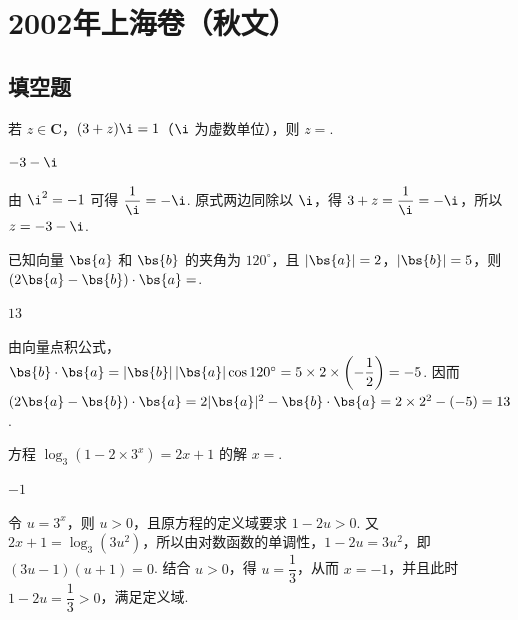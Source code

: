 \chapter{2002年上海卷（秋文）}
\section{填空题}
\begin{problem}
若 \(z \in \mathbf{C}\)，\((3 + z)\i = 1\)（\(\i\) 为虚数单位），则 \(z=\)\fillinblank{}.
\end{problem}

\begin{answer}
\(-3-\i\)
\end{answer}

\begin{solution}
由 \(\i^2=-1\) 可得 \(\dfrac{1}{\i}=-\i\). 原式两边同除以 \(\i\)，得 \(3+z=\dfrac{1}{\i}=-\i\)，所以 \(z=-3-\i\).
\end{solution}

\begin{problem}
已知向量 \(\bs{a}\) 和 \(\bs{b}\) 的夹角为 \(120^{\circ}\)，且 \(|\bs{a}| = 2\)，\(|\bs{b}| = 5\)，则 \((2\bs{a} - \bs{b}) \cdot \bs{a}=\)\fillinblank{}.
\end{problem}

\begin{answer}
\(13\)
\end{answer}

\begin{solution}
由向量点积公式，\(\bs{b}\cdot\bs{a}=|\bs{b}|\,|\bs{a}|\cos120^{\circ}=5\times2\times\left(-\dfrac{1}{2}\right)=-5\). 因而 \((2\bs{a}-\bs{b})\cdot\bs{a}=2|\bs{a}|^2-\bs{b}\cdot\bs{a}=2\times2^2-(-5)=13\).
\end{solution}

\begin{problem}
方程 \(\log_{3}(1 - 2 \times 3^{x}) = 2x + 1\) 的解 \(x=\)\fillinblank{}.
\end{problem}

\begin{answer}
\(-1\)
\end{answer}

\begin{solution}
令 \(u=3^x\)，则 \(u>0\)，且原方程的定义域要求 \(1-2u>0\). 又 \(2x+1=\log_3(3u^2)\)，所以由对数函数的单调性，\(1-2u=3u^2\)，即 \((3u-1)(u+1)=0\). 结合 \(u>0\)，得 \(u=\dfrac{1}{3}\)，从而 \(x=-1\)，并且此时 \(1-2u=\dfrac{1}{3}>0\)，满足定义域.
\end{solution}

